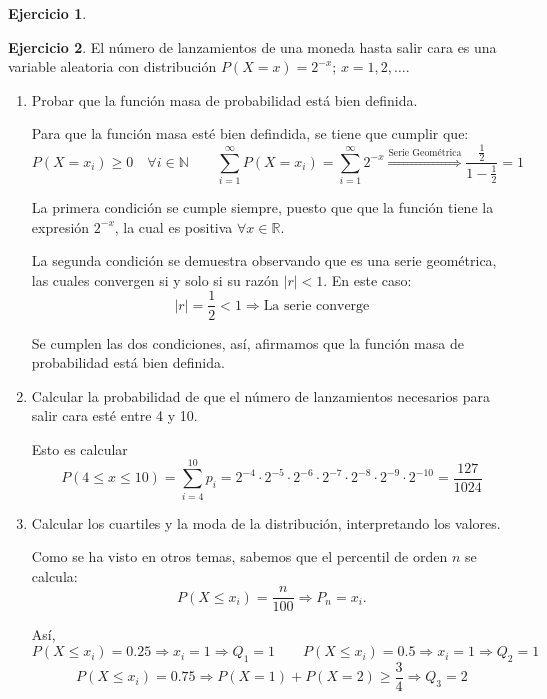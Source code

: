 \documentclass[a4paper, 12pt]{article}
\theoremstyle{definition}
\newtheorem{ej}{Ejercicio}
\begin{document}
\newpage

\begin{ej}

\end{ej}

\begin{ej}
El número de lanzamientos de una moneda hasta salir cara es una variable aleatoria con distribución \(P(X=x) = 2^{-x}\); \(x=1,2,\dotsc\).

\begin{enumerate}[label=\textit{\alph*)}]
	\item Probar que la función masa de probabilidad está bien definida.
	
Para que la función masa esté bien defindida, se tiene que cumplir que:
\[
	P(X=x_i) \geq 0 \quad \forall i \in \mathbb{N} \qquad \sum_{i=1}^{\infty} P(X=x_i) = \sum_{i=1}^{\infty} 2^{-x} \overset{\text{Serie Geométrica}}{\Rightarrow} \frac{\frac{1}{2}}{1-\frac{1}{2}} = 1
\]

La primera condición se cumple siempre, puesto que que la función tiene la expresión \(2^{-x}\), la cual es positiva \(\forall x \in \mathbb{R}\).

La segunda condición se demuestra observando que es una serie geométrica, las cuales convergen si y solo si su razón \(|r| < 1\). En este caso:
\[
	|r| = \frac{1}{2} < 1 \Rightarrow \text{La serie converge}
\]

Se cumplen las dos condiciones, así, afirmamos que la función masa de probabilidad está bien definida.

	\item Calcular la probabilidad de que el número de lanzamientos necesarios para salir cara esté entre 4 y 10.
	
Esto es calcular
\[
	P(4 \leq x \leq 10) = \sum_{i=4}^{10}p_i = 2^{-4} \cdot 2^{-5} \cdot 2^{-6} \cdot 2^{-7} \cdot 2^{-8} \cdot 2^{-9} \cdot 2^{-10} = \frac{127}{1024}
\]

	\item Calcular los cuartiles y la moda de la distribución, interpretando los valores.
	
Como se ha visto en otros temas, sabemos que el percentil de orden \(n\) se calcula:
\[
	P(X \leq x_i) = \frac{n}{100} \Rightarrow P_n = x_i.
\]

Así, 
\[
	P(X \leq x_i) = 0.25 \Rightarrow x_i = 1 \Rightarrow Q_1 = 1 \qquad P(X \leq x_i) = 0.5 \Rightarrow x_i = 1 \Rightarrow Q_2 = 1
\]
\[
	P(X \leq x_i) = 0.75 \Rightarrow P(X=1) + P(X=2) \geq \frac{3}{4} \Rightarrow Q_3 = 2
\]


\end{enumerate}
\end{ej}
\end{document}
